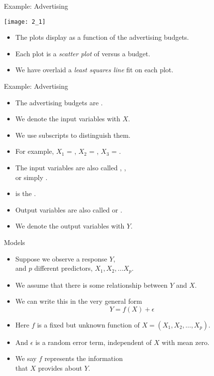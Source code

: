 \documentclass[mathserif, aspectratio=169]{beamer}
\begin{document}
\begin{frame}[t]{Example: Advertising}
	\vspace{-5mm}
	\begin{center}
		\texttt{[image: 2\_1]}
	\end{center}
	\vspace{-5mm}
	\begin{itemize}
		\item The plots display  as a function of the advertising budgets.
		\item Each plot is a \emph{scatter plot} of  versus a budget.
		\item We have overlaid a \emph{least squares line} fit on each plot.
	\end{itemize}
\end{frame}

\begin{frame}{Example: Advertising}
	\begin{itemize}
		\item The advertising budgets are .
		\item We denote the input variables with $X$.
		\item We use subscripts to distinguish them.
		\item For example, $X_1$ = , $X_2$ = , $X_3$ = .
		\item The input variables are also called , , \\
			 or simply .
		\item {} is the .
		\item Output variables are also called  or .
		\item We denote the output variables with $Y$.
	\end{itemize}
\end{frame}

\begin{frame}{Models}
	\begin{itemize}
		\item Suppose we observe a  response $Y$,\\
			and $p$ different predictors, $X_1, X_2, \dots X_p$. 
		\item We assume that there is some relationship between $Y$ and $X$.
		\item We can write this in the very general form
			\[ Y = f(X) + \epsilon\]
		\item Here $f$ is a fixed but unknown function of $X = (X_1, X_2, \dots, X_p)$.
		\item And $\epsilon$ is a random error term, independent of $X$ with mean zero.
		\item We say $f$ represents the  information\\
			that $X$ provides about $Y$.
	\end{itemize}
\end{frame}
\end{document}

